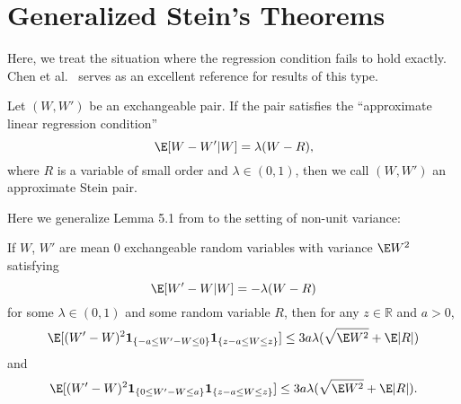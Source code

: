\section{Generalized Stein's Theorems}
Here, we treat the situation where the regression condition fails to hold exactly.
Chen et al.\ \cite{chen2010normal} serves as an excellent reference for results
of this type.

\begin{definition}
  Let $(W, W')$ be an exchangeable pair.  If the pair satisfies the ``approximate linear
  regression condition''
  \begin{equation}
    \label{D:approx-stein-pair}
    \E [W - W' | W] = \lambda (W - R),
  \end{equation}
  where $R$ is a variable of small order and $\lambda \in (0, 1)$, then we call $(W, W')$ an
  approximate Stein pair.
\end{definition}

Here we generalize Lemma 5.1 from \cite{chen2010normal} to the setting of non-unit variance:
\begin{theorem}
  \label{L:stein-difference-second-moment-generalization-bound}
  If $W$, $W'$ are mean 0 exchangeable random variables with variance $\E W^2$
  satisfying
  \begin{equation*}
    \E[W'-W|W] = -\lambda(W-R)
  \end{equation*}
  for some $\lambda \in (0,1)$ and some random variable $R$, then for any
  $z \in \mathbb{R}$ and $a > 0$,
  \begin{equation*}
    \E [(W'-W)^2 \mathbf{1}_{\{-a \leq W' - W \leq 0\}} \mathbf{1}_{\{z-a \leq W \leq z\}}] \leq
    3a \lambda (\sqrt{\E W^2} + \E |R|)
  \end{equation*}
  and
  \begin{equation*}
    \E [(W'-W)^2 \mathbf{1}_{\{0 \leq W' - W \leq a\}} \mathbf{1}_{\{z-a \leq W \leq z\}}] \leq
        3a \lambda (\sqrt{\E W^2} + \E |R|).
  \end{equation*}
\end{theorem}

